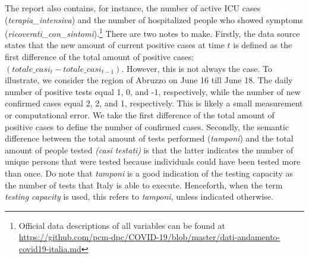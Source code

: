 \documentclass[12pt]{article}
\begin{document}
	The report also contains, for instance, the number of active ICU cases (\textit{terapia\_intensiva}) and the number of hospitalized people who showed symptoms (\textit{ricoverati\_con\_sintomi}).\footnote{Official data descriptions of all variables can be found at \url{https://github.com/pcm-dpc/COVID-19/blob/master/dati-andamento-covid19-italia.md}} There are two notes to make. Firstly, the data source states that the new amount of current positive cases at time $t$ is defined as the first difference of the total amount of positive cases: $(totale\_casi_t - totale\_casi_{t-1})$. However, this is not always the case. To illustrate, we consider the region of Abruzzo on June 16 till June 18. The daily number of positive tests equal 1, 0, and -1, respectively, while the number of new confirmed cases equal 2, 2, and 1, respectively. This is likely a small measurement or computational error. We take the first difference of the total amount of positive cases to define the number of confirmed cases. Secondly, the semantic difference between the total amount of tests performed (\textit{tamponi}) and the total amount of people tested \textit{(casi testati)} is that the latter indicates the number of unique persons that were tested because individuals could have been tested more than once. Do note that \textit{tamponi} is a good indication of the testing capacity as the number of tests that Italy is able to execute. Henceforth, when the term \textit{testing capacity} is used, this refers to \textit{tamponi}, unless indicated otherwise. \\
	
\end{document}

